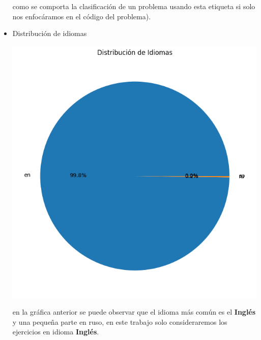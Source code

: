 \documentclass{article}
\begin{document}
\begin{itemize}
          como se comporta la clasificación de un problema usando esta etiqueta si solo nos enfocáramos en el código del problema). 
    \item Distribución de idiomas
          \begin{center}
              \includegraphics[scale=0.6]{imgs/langs_dist.png}
          \end{center}
          en la gráfica anterior se puede observar que el idioma más común es el \textbf{Inglés} y una pequeña parte en ruso, en este trabajo
          solo consideraremos los ejercicios en idioma \textbf{Inglés}.
          \newpage
          

\end{itemize}
\end{document}
